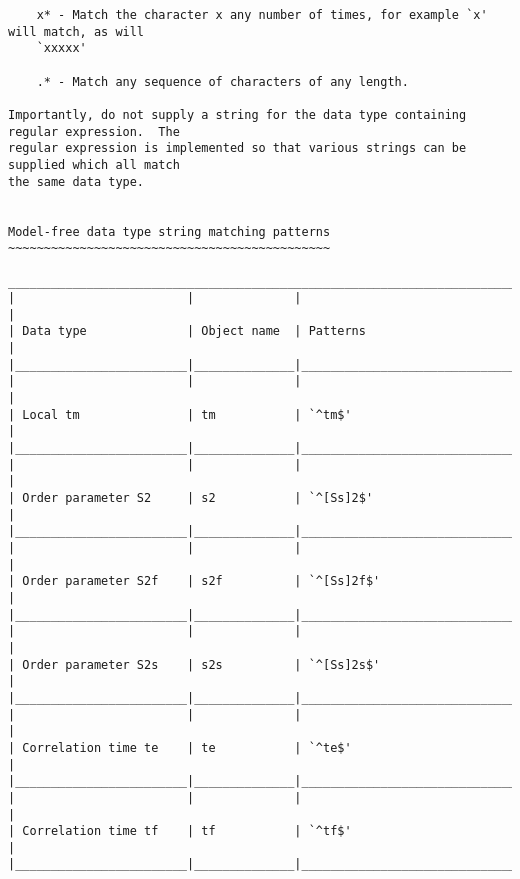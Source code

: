 {\begin{verbatim}
    x* - Match the character x any number of times, for example `x' will match, as will
    `xxxxx'

    .* - Match any sequence of characters of any length.

Importantly, do not supply a string for the data type containing regular expression.  The
regular expression is implemented so that various strings can be supplied which all match
the same data type.


Model-free data type string matching patterns
~~~~~~~~~~~~~~~~~~~~~~~~~~~~~~~~~~~~~~~~~~~~~

____________________________________________________________________________________________
|                        |              |                                                  |
| Data type              | Object name  | Patterns                                         |
|________________________|______________|__________________________________________________|
|                        |              |                                                  |
| Local tm               | tm           | `^tm$'                                           |
|________________________|______________|__________________________________________________|
|                        |              |                                                  |
| Order parameter S2     | s2           | `^[Ss]2$'                                        |
|________________________|______________|__________________________________________________|
|                        |              |                                                  |
| Order parameter S2f    | s2f          | `^[Ss]2f$'                                       |
|________________________|______________|__________________________________________________|
|                        |              |                                                  |
| Order parameter S2s    | s2s          | `^[Ss]2s$'                                       |
|________________________|______________|__________________________________________________|
|                        |              |                                                  |
| Correlation time te    | te           | `^te$'                                           |
|________________________|______________|__________________________________________________|
|                        |              |                                                  |
| Correlation time tf    | tf           | `^tf$'                                           |
|________________________|______________|__________________________________________________|

\end{verbatim}}
